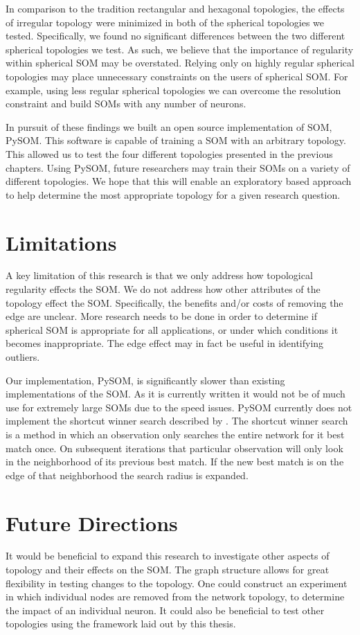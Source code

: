 In comparison to the tradition rectangular and hexagonal topologies, the effects
of irregular topology were minimized in both of the spherical
topologies we tested.  Specifically, we found no significant differences
between the two different spherical topologies we test.  As such, we believe
that the importance of regularity within spherical SOM may be overstated.
Relying only on highly regular spherical topologies may place
unnecessary constraints on the users of spherical SOM.  For example, using less
regular spherical topologies we can overcome the resolution constraint and build
SOMs with any number of neurons.

In pursuit of these findings we built an open source implementation of SOM,
PySOM. This software is capable of training a SOM with an arbitrary
topology.  This allowed us to test the four different topologies presented in
the previous chapters.  Using PySOM, future researchers may train their
SOMs on a variety of different topologies.  We hope that this will enable an
exploratory based approach to help determine the most appropriate topology for
a given research question.


\section{Limitations}
A key limitation of this research is that we only address how topological
regularity effects the SOM.  We do not address how other attributes of the
topology effect the SOM. Specifically, the benefits and/or costs of removing the
edge are unclear.  More research needs to be done in order to determine if spherical SOM
is appropriate for all applications, or under which conditions it becomes
inappropriate.  The edge effect may in fact be useful in identifying outliers.

Our implementation, PySOM, is significantly slower than existing implementations
of the SOM.  As it is currently written it would not be of much use for
extremely large SOMs due to the speed issues.  PySOM currently does not
implement the shortcut winner search described by \cite{Kohonen2000}.  The
shortcut winner search is a method in which an observation only searches the entire
network for it best match once.  On subsequent iterations that particular
observation will only look in the neighborhood of its previous best match. If
the new best match is on the edge of that neighborhood the search radius is
expanded.


\section{Future Directions}
It would be beneficial to expand this research to investigate other aspects of
topology and their effects on the SOM.  The graph structure allows for great
flexibility in testing changes to the topology.  One could construct an
experiment in which individual nodes are removed from the network topology, to
determine the impact of an individual neuron.  It could also be beneficial to
test other topologies using the framework laid out by this thesis.

